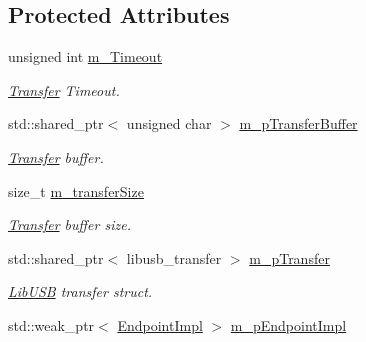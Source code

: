 \subsection*{Protected Attributes}
\begin{DoxyCompactItemize}
\item 
\hypertarget{class_lib_u_s_b_1_1_transfer_impl_a8a9d3f1550a492dc0145312afbeec707}{unsigned int \hyperlink{class_lib_u_s_b_1_1_transfer_impl_a8a9d3f1550a492dc0145312afbeec707}{m\-\_\-\-Timeout}}\label{class_lib_u_s_b_1_1_transfer_impl_a8a9d3f1550a492dc0145312afbeec707}

\begin{DoxyCompactList}\small\item\em \hyperlink{class_lib_u_s_b_1_1_transfer}{Transfer} Timeout. \end{DoxyCompactList}\item 
\hypertarget{class_lib_u_s_b_1_1_transfer_impl_ada1f6067f13b351f0302d552baa8cbd0}{std\-::shared\-\_\-ptr$<$ unsigned char $>$ \hyperlink{class_lib_u_s_b_1_1_transfer_impl_ada1f6067f13b351f0302d552baa8cbd0}{m\-\_\-p\-Transfer\-Buffer}}\label{class_lib_u_s_b_1_1_transfer_impl_ada1f6067f13b351f0302d552baa8cbd0}

\begin{DoxyCompactList}\small\item\em \hyperlink{class_lib_u_s_b_1_1_transfer}{Transfer} buffer. \end{DoxyCompactList}\item 
\hypertarget{class_lib_u_s_b_1_1_transfer_impl_ad50c36c9ce47f0a8ea1a628e9d5a5c13}{size\-\_\-t \hyperlink{class_lib_u_s_b_1_1_transfer_impl_ad50c36c9ce47f0a8ea1a628e9d5a5c13}{m\-\_\-transfer\-Size}}\label{class_lib_u_s_b_1_1_transfer_impl_ad50c36c9ce47f0a8ea1a628e9d5a5c13}

\begin{DoxyCompactList}\small\item\em \hyperlink{class_lib_u_s_b_1_1_transfer}{Transfer} buffer size. \end{DoxyCompactList}\item 
\hypertarget{class_lib_u_s_b_1_1_transfer_impl_a5fdeade395d427c56b0b99c4faed3cd8}{std\-::shared\-\_\-ptr$<$ libusb\-\_\-transfer $>$ \hyperlink{class_lib_u_s_b_1_1_transfer_impl_a5fdeade395d427c56b0b99c4faed3cd8}{m\-\_\-p\-Transfer}}\label{class_lib_u_s_b_1_1_transfer_impl_a5fdeade395d427c56b0b99c4faed3cd8}

\begin{DoxyCompactList}\small\item\em \hyperlink{class_lib_u_s_b_1_1_lib_u_s_b}{Lib\-U\-S\-B} transfer struct. \end{DoxyCompactList}\item 
\hypertarget{class_lib_u_s_b_1_1_transfer_impl_a695a90ce73d8f5dd22fde28e0250fd16}{std\-::weak\-\_\-ptr$<$ \hyperlink{class_lib_u_s_b_1_1_endpoint_impl}{Endpoint\-Impl} $>$ \hyperlink{class_lib_u_s_b_1_1_transfer_impl_a695a90ce73d8f5dd22fde28e0250fd16}{m\-\_\-p\-Endpoint\-Impl}}\label{class_lib_u_s_b_1_1_transfer_impl_a695a90ce73d8f5dd22fde28e0250fd16}


\end{DoxyCompactItemize}
